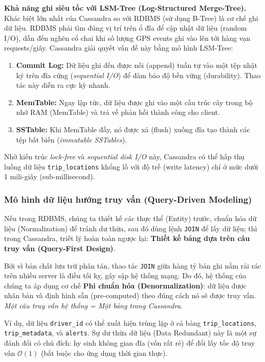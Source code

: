 \bigskip
\noindent
\textbf{Khả năng ghi siêu tốc với LSM-Tree (Log-Structured Merge-Tree).} Khác biệt lớn nhất của Cassandra so với RDBMS (sử dụng B-Tree) là cơ chế ghi dữ liệu. RDBMS phải tìm đúng vị trí trên ổ đĩa để cập nhật dữ liệu (random I/O), dẫn đến nghẽn cổ chai khi số lượng GPS events ghi vào lên tới hàng vạn requests/giây. Cassandra giải quyết vấn đề này bằng mô hình LSM-Tree:
\begin{enumerate}
    \item \textbf{Commit Log:} Dữ liệu ghi đến được nối (append) tuần tự vào một tệp nhật ký trên đĩa cứng (\textit{sequential I/O}) để đảm bảo độ bền vững (durability). Thao tác này diễn ra cực kỳ nhanh.
    \item \textbf{MemTable:} Ngay lập tức, dữ liệu được ghi vào một cấu trúc cây trong bộ nhớ RAM (MemTable) và trả về phản hồi thành công cho client.
    \item \textbf{SSTable:} Khi MemTable đầy, nó được xả (flush) xuống đĩa tạo thành các tệp bất biến (\textit{immutable SSTables}).
\end{enumerate}
Nhờ kiến trúc \textit{lock-free} và \textit{sequential disk I/O} này, Cassandra có thể hấp thụ luồng dữ liệu \texttt{trip\_locations} khổng lồ với độ trễ (write latency) chỉ ở mức dưới 1 mili-giây (sub-millisecond).

\subsubsection{Mô hình dữ liệu hướng truy vấn (Query-Driven Modeling)}
\label{sec:cassandra-modeling}

Nếu trong RDBMS, chúng ta thiết kế các thực thể (Entity) trước, chuẩn hóa dữ liệu (Normalization) để tránh dư thừa, sau đó dùng lệnh \texttt{JOIN} để lấy dữ liệu; thì trong Cassandra, triết lý hoàn toàn ngược lại: \textbf{Thiết kế bảng dựa trên câu truy vấn (Query-First Design)}.

Bởi vì bản chất lưu trữ phân tán, thao tác \texttt{JOIN} giữa hàng tỷ bản ghi nằm rải rác trên nhiều server là điều tối kỵ, gây sập hệ thống mạng. Do đó, hệ thống của chúng ta áp dụng cơ chế \textbf{Phi chuẩn hóa (Denormalization)}: dữ liệu được nhân bản và định hình sẵn (pre-computed) theo đúng cách nó sẽ được truy vấn. \textit{Một câu truy vấn hệ thống = Một bảng trong Cassandra}.

Ví dụ, dữ liệu \texttt{driver\_id} có thể xuất hiện trùng lặp ở cả bảng \texttt{trip\_locations}, \texttt{trip\_metadata}, và \texttt{alerts}. Sự dư thừa dữ liệu (Data Redundant) này là một sự đánh đổi có chủ đích: hy sinh không gian đĩa (vốn rất rẻ) để đổi lấy tốc độ truy vấn $\mathcal{O}(1)$ (bắt buộc cho ứng dụng thời gian thực).

